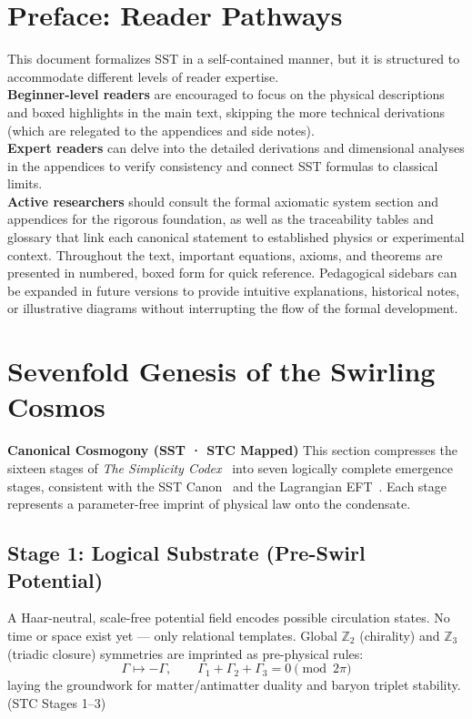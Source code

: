 \documentclass[10pt,reprint,aps,onecolumn,nofootinbib]{revtex4-2}
\renewcommand{\cftsecfont}{\footnotesize}
\renewcommand{\cftsubsecfont}{\footnotesize\itshape}
\newcommand{\compacttoc}{%
    \begingroup
    \setlength{\cftparskip}{0pt}%
    \setlength{\cftbeforesecskip}{0.5pt}%
    \setlength{\cftbeforesubsecskip}{0.5pt}%
    \renewcommand{\cftsecfont}{\scriptsize}%
    \renewcommand{\cftsubsecfont}{\scriptsize\itshape}%
    \renewcommand{\cftsecpagefont}{\scriptsize}%
    \renewcommand{\cftsubsecpagefont}{\scriptsize}%
    \setlength{\cftsecnumwidth}{2.8em}%
    \setlength{\cftsubsecindent}{1.4em}%
    \renewcommand{\cftdotsep}{2}%
    \setlength{\parskip}{0pt}%
    \linespread{0.80}\selectfont
    \tableofcontents
    \endgroup
}
\begin{document}
    \section*{Preface: Reader Pathways}
        This document formalizes SST in a self-contained manner, but it is structured to accommodate different levels of reader expertise.\\
        \textbf{Beginner-level readers} are encouraged to focus on the physical descriptions and boxed highlights in the main text, skipping the more technical derivations (which are relegated to the appendices and side notes).\\
        \textbf{Expert readers} can delve into the detailed derivations and dimensional analyses in the appendices to verify consistency and connect SST formulas to classical limits.\\
        \textbf{Active researchers} should consult the formal axiomatic system section and appendices for the rigorous foundation, as well as the traceability tables and glossary that link each canonical statement to established physics or experimental context. Throughout the text, important equations, axioms, and theorems are presented in numbered, boxed form for quick reference. Pedagogical sidebars can be expanded in future versions to provide intuitive explanations, historical notes, or illustrative diagrams without interrupting the flow of the formal development.



        \newpage
        \compacttoc
        \newpage
    \section{Sevenfold Genesis of the Swirling Cosmos}
        \label{sec:cosmogony-seven}

        \noindent
        \textbf{Canonical Cosmogony (SST · STC Mapped)}
        This section compresses the sixteen stages of \emph{The Simplicity Codex}~\cite{Goldau2025_STC}
        into seven logically complete emergence stages, consistent with the SST Canon~\canonversion{}
        and the Lagrangian EFT~\cite{Iskandarani2025_Lagrangian}.
        Each stage represents a parameter-free imprint of physical law onto the condensate.

        \subsection*{Stage 1: Logical Substrate (Pre-Swirl Potential)}
            A Haar-neutral, scale-free potential field encodes possible circulation states.
            No time or space exist yet — only relational templates.
            Global $\mathbb{Z}_2$ (chirality) and $\mathbb{Z}_3$ (triadic closure) symmetries are imprinted as pre-physical rules:
            \[
                \Gamma \mapsto -\Gamma,
                \qquad
                \Gamma_1 + \Gamma_2 + \Gamma_3 = 0 \pmod{2\pi}
            \]
            laying the groundwork for matter/antimatter duality and baryon triplet stability.
            \hfill (STC Stages 1–3)
\end{document}

